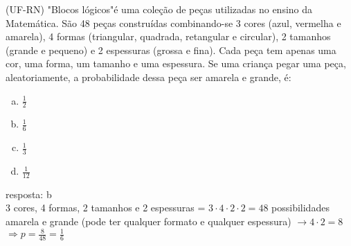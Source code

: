 \begin{ex}
 (UF-RN) "Blocos lógicos"é uma coleção de peças utilizadas no ensino da Matemática. São 48 peças construídas combinando-se 3 cores (azul, vermelha e amarela), 4 formas (triangular, quadrada, retangular e circular), 2 tamanhos (grande e pequeno) e 2 espessuras (grossa e fina). Cada peça tem apenas uma cor, uma forma, um tamanho e uma espessura. Se uma criança pegar uma peça, aleatoriamente, a probabilidade dessa peça ser amarela e grande, é:
    \begin{enumerate}[(a)]
    \item $\frac{1}{2}$
    \item $\frac{1}{6}$
    \item $\frac{1}{3}$
    \item $\frac{1}{12}$
    \end{enumerate}
      \begin{sol}
         resposta: b  \\
         3 cores, 4 formas, 2 tamanhos e 2 espessuras = $3\cdot4\cdot2\cdot2=48$ possibilidades \\
         amarela e grande (pode ter qualquer formato e qualquer espessura) $\longrightarrow 4\cdot2 =8$ \\
         $\Longrightarrow p=\frac{8}{48}=\frac{1}{6}$  
         \end{sol}
\end{ex}